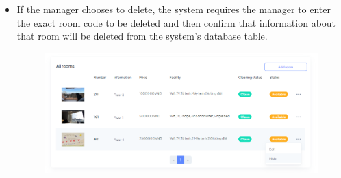 \begin{itemize}
\begin{itemize}
\begin{figure}[H]
                \label{fig:editroom}
            \end{figure}
            \item If the manager chooses to delete, the system requires the manager to enter the exact room code to be deleted and then confirm that information about that room will be deleted from the system's database table.
            \begin{figure}[H]
                \includegraphics[width=1\linewidth]{img/deleteroom.png}
                \label{fig:deleteroom}
            \end{figure}
        \end{itemize}
    \end{itemize}
